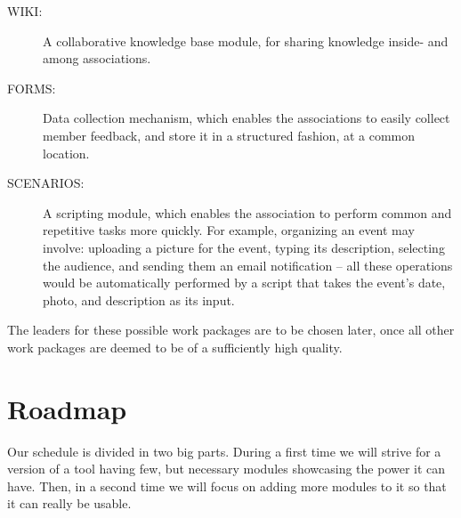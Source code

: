 \documentclass[a4paper, 12pt]{article}
\begin{document}
\begin{description}
	\item[WIKI:] A collaborative knowledge base module, for sharing knowledge inside- and among associations.
    \item[FORMS:] Data collection mechanism, which enables the associations to easily collect member feedback, and store it in a structured fashion, at a common location.
    \item[SCENARIOS:] A scripting module, which enables the association to perform common and repetitive tasks more quickly. For example, organizing an event may involve: uploading a picture for the event, typing its description, selecting the audience, and sending them an email notification -- all these operations would be automatically performed by a script that takes the event's date, photo, and description as its input.
\end{description}

The leaders for these possible work packages are to be chosen later, once all other work packages are deemed to be of a sufficiently high quality.

\section{Roadmap}
Our schedule is divided in two big parts. During a first time we will strive for a version of a tool having few, but necessary modules showcasing the power it can have. Then, in a second time we will focus on adding more modules to it so that it can really be usable.
\end{document}
